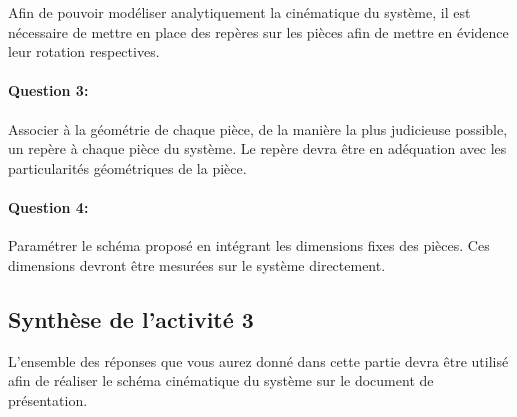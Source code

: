 Afin de pouvoir modéliser analytiquement la cinématique du système, il est nécessaire de mettre en place des repères sur les pièces afin de mettre en évidence leur rotation respectives.

\paragraph{Question 3:} Associer à la géométrie de chaque pièce, de la manière la plus judicieuse possible, un repère à chaque pièce du système. Le repère devra être en adéquation avec les particularités géométriques de la pièce.

\paragraph{Question 4:} Paramétrer le schéma proposé en intégrant les dimensions fixes des pièces. Ces dimensions devront être mesurées sur le système directement.

\reponse[4]

\subsection{Synthèse de l'activité 3}

L'ensemble des réponses que vous aurez donné dans cette partie devra être utilisé afin de réaliser le schéma cinématique du système sur le document de présentation.


